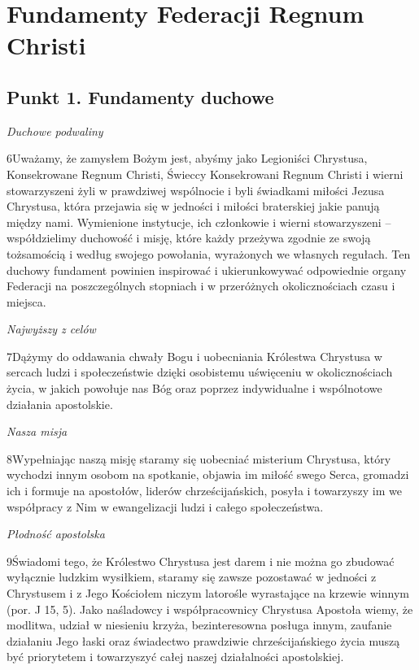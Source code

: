 ﻿\documentclass{book}
\newcommand{\lett}[1]{\lettrine[findent=6pt]{#1}}
\newcommand{\ssec}[1]{\vspace{1em}\textit{#1}\vspace{.5em}\nopagebreak}
\begin{document}
\chapter{Fundamenty Federacji Regnum Christi}


\section{Punkt 1. Fundamenty duchowe}


\ssec{Duchowe podwaliny}


\lett{6} Uważamy, że zamysłem Bożym jest, abyśmy jako Legioniści Chrystusa, Konsekrowane Regnum Christi, Świeccy Konsekrowani Regnum Christi i wierni stowarzyszeni żyli w prawdziwej wspólnocie i byli świadkami miłości Jezusa Chrystusa, która przejawia się w jedności  i miłości braterskiej jakie panują między nami. Wymienione instytucje, ich członkowie i wierni stowarzyszeni – współdzielimy duchowość i misję, które każdy przeżywa zgodnie ze swoją tożsamością i według swojego powołania, wyrażonych we własnych regułach. Ten duchowy fundament powinien inspirować i ukierunkowywać odpowiednie organy Federacji na poszczególnych stopniach i w przeróżnych okolicznościach czasu i miejsca.


\ssec{Najwyższy z celów}


\lett{7} Dążymy do oddawania chwały Bogu i uobecniania Królestwa Chrystusa w sercach ludzi i społeczeństwie dzięki osobistemu uświęceniu w okolicznościach życia, w jakich powołuje nas Bóg oraz poprzez indywidualne i wspólnotowe działania apostolskie.


\ssec{Nasza misja}
 
\lett{8} Wypełniając naszą misję staramy się uobecniać misterium Chrystusa, który wychodzi innym osobom na spotkanie, objawia im miłość swego Serca, gromadzi ich i formuje na apostołów, liderów chrześcijańskich, posyła i towarzyszy im we współpracy z Nim w ewangelizacji ludzi i całego społeczeństwa.


\ssec{Płodność apostolska}
 
\lett{9} {Ś}wiadomi tego, że Królestwo Chrystusa jest darem i nie można go zbudować wyłącznie ludzkim wysiłkiem, staramy się zawsze pozostawać w jedności z Chrystusem i z Jego Kościołem niczym latorośle wyrastające na krzewie winnym (por. J 15, 5). Jako naśladowcy i współpracownicy Chrystusa Apostoła wiemy, że modlitwa, udział w niesieniu krzyża, bezinteresowna posługa innym, zaufanie działaniu Jego łaski oraz świadectwo prawdziwie chrześcijańskiego życia muszą być priorytetem i towarzyszyć całej naszej działalności apostolskiej.
 
\end{document}
